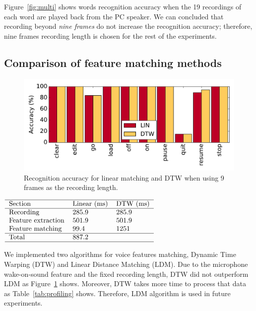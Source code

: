 Figure~\ref{fig:multi} shows words recognition accuracy when the 19 recordings of each word are played back from the PC speaker. We can concluded that recording beyond \textit{nine frames} do not increase the recognition accuracy; therefore, nine frames recording length is chosen for the rest of the experiments. 

\subsection{Comparison of feature matching methods}
%
\begin{figure}
\centering
\includegraphics[width=\linewidth]{figures/DTWvsLDM}
\caption{Recognition accuracy for linear matching and DTW when using 9 frames as the recording length.}
\label{fig:DTWvsLDM}
\end{figure}
%
\begin{table}
	\centering
	\caption{Profiling of features matching algorithms: Dynamic Time Warping (DTW) and Linear Distance Matching (LDM)}
	\label{tab:profiling}
	$
	\begin{tabular}{lll}\hline
	Section & Linear (ms) & DTW (ms) \\\hline
	Recording & 285.9  & 285.9 \\
	Feature extraction & 501.9 & 501.9 \\
	Feature matching &  99.4 & 1251 \\\hline
	Total & 887.2 & \\\hline
	\end{tabular}
	$
\end{table}
%
We implemented two algorithms for voice features matching, Dynamic Time Warping (DTW) and Linear Distance Matching (LDM). Due to the microphone wake-on-sound feature and the fixed recording length, DTW did not outperform LDM as Figure~\ref{fig:DTWvsLDM} shows. Moreover, DTW takes more time to process that data as Table~\ref{tab:profiling} shows. Therefore, LDM algorithm is used in future experiments.

